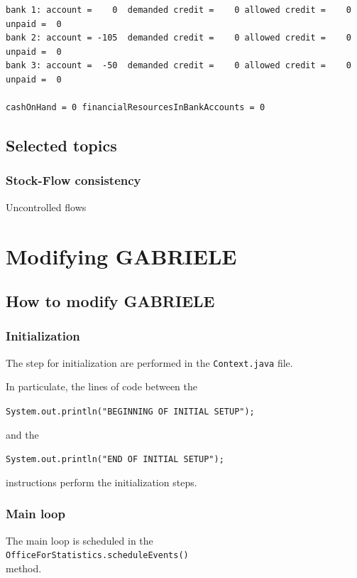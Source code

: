 \documentclass{book}
\begin{document}
\begin{verbatim}
bank 1: account =    0  demanded credit =    0 allowed credit =    0 unpaid =  0
bank 2: account = -105  demanded credit =    0 allowed credit =    0 unpaid =  0
bank 3: account =  -50  demanded credit =    0 allowed credit =    0 unpaid =  0

cashOnHand = 0 financialResourcesInBankAccounts = 0
\end{verbatim}


\iffalse
\chapter{Selected topics}

\section{Stock-Flow consistency}

Uncontrolled flows

\part{Modifying GABRIELE}

\chapter{How to modify GABRIELE}

\section{Initialization}
The step for initialization are performed in the \verb+Context.java+ file.

In particulate, the lines of code between the

\verb+System.out.println("BEGINNING OF INITIAL SETUP");+

and the

\verb+System.out.println("END OF INITIAL SETUP");+

instructions perform the initialization steps.


\section{Main loop}

The main loop is scheduled in the\\ \verb+OfficeForStatistics.scheduleEvents()+\\ method.
\end{document}
